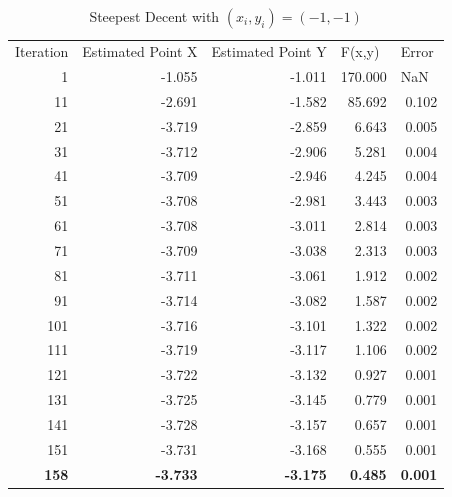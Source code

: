 \documentclass[12pt]{article}
\begin{document}
\begin{table}[h!]
  \centering
  \caption{Steepest Decent with $(x_i,y_i) = (-1,-1)$}
    \begin{tabular}{rrrrr}
    \multicolumn{1}{l}{Iteration } & \multicolumn{1}{l}{Estimated Point X} & \multicolumn{1}{l}{Estimated Point Y} & \multicolumn{1}{l}{F(x,y)} & \multicolumn{1}{l}{Error} \\
    1     & -1.055 & -1.011 & 170.000 & \multicolumn{1}{l}{NaN} \\
    11    & -2.691 & -1.582 & 85.692 & 0.102 \\
    21    & -3.719 & -2.859 & 6.643 & 0.005 \\
    31    & -3.712 & -2.906 & 5.281 & 0.004 \\
    41    & -3.709 & -2.946 & 4.245 & 0.004 \\
    51    & -3.708 & -2.981 & 3.443 & 0.003 \\
    61    & -3.708 & -3.011 & 2.814 & 0.003 \\
    71    & -3.709 & -3.038 & 2.313 & 0.003 \\
    81    & -3.711 & -3.061 & 1.912 & 0.002 \\
    91    & -3.714 & -3.082 & 1.587 & 0.002 \\
    101   & -3.716 & -3.101 & 1.322 & 0.002 \\
    111   & -3.719 & -3.117 & 1.106 & 0.002 \\
    121   & -3.722 & -3.132 & 0.927 & 0.001 \\
    131   & -3.725 & -3.145 & 0.779 & 0.001 \\
    141   & -3.728 & -3.157 & 0.657 & 0.001 \\
    151   & -3.731 & -3.168 & 0.555 & 0.001 \\
    \textbf{158} & \textbf{-3.733} & \textbf{-3.175} & \textbf{0.485} & \textbf{0.001} \\
    \end{tabular}%
  \label{tab:SDM_guess4}%
\end{table}%
\end{document}
